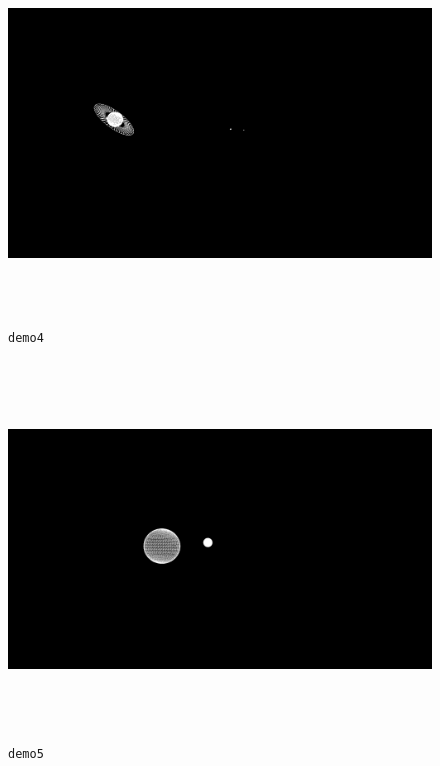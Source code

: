 \documentclass[11pt,a4paper]{report}
\begin{document}
\begin{figure}[H]
\centering
\includegraphics[width = 15cm,height = 10cm]{4.png}
\caption{\texttt{demo4}}
\label{fig:demo4}
\end{figure}

\begin{figure}[H]
\centering
\includegraphics[width = 15cm,height = 10cm]{5.png}
\caption{\texttt{demo5}}
\label{fig:demo5}
\end{figure}
\end{document}
